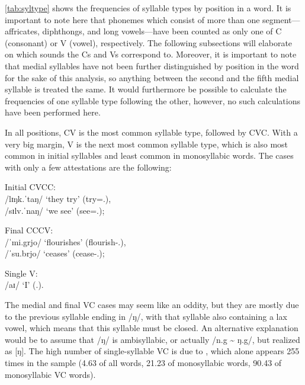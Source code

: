 \autoref{tab:syltype} shows the frequencies of syllable types by position in a 
word. It is important to note here that phonemes which consist of more than one 
segment---affricates, diphthongs, and long vowels---have been counted as only 
one of C (consonant) or V (vowel), respectively. The following subsections will 
elaborate on which sounds the Cs and Vs correspond to. Moreover, it is important 
to note that medial syllables have not been further distinguished by position in 
the word for the sake of this analysis, so anything between the second and the 
fifth medial syllable is treated the same. It would furthermore be possible to 
calculate the frequencies of one syllable type following the other, 
however, no such calculations have been performed here.

In all positions, CV is the most common syllable type, followed by CVC. With a 
very big margin, V is the next most common syllable type, which is also most 
common in initial syllables and least common in monosyllabic words. The cases 
with only a few attestations are the following:

\pex
	\a Initial CVCC:\\
		 /lɪŋk.ˈtaŋ/ `they try' (try=\TplM{}.\Aarg{}),\footnotemark\\
		 /sɪlv.ˈnaŋ/ `we see' (see=\Fpl{}.\Aarg{});
		
	\a Final CCCV:\\
		 /ˈmi.grjo/ `flourishes' (flourish-\Tsg{}.\N{}),\\
		 /ˈsu.brjo/ `ceases' (cease-\Tsg{}.\N{});
	
	\a Single V:\\
		 /aɪ/ `I' (\Fsg{}.\Top{}).
\xe


%
The medial and final VC cases may seem like an oddity, but they are mostly due 
to the previous syllable ending in /ŋ/, with that syllable also containing a 
lax vowel, which means that this syllable must be closed. An alternative 
explanation would be to assume that /ŋ/ is ambisyllabic, or actually /n.g 
\textasciitilde{} ŋ.g/, but realized as [ŋ].\label{ŋ} The high number of 
single-syllable VC is due to , which alone appears 255 
times in the sample (4.63\pct{} of all words, 21.23\pct{} of monosyllabic 
words, 90.43\pct{} of monosyllabic VC words).

